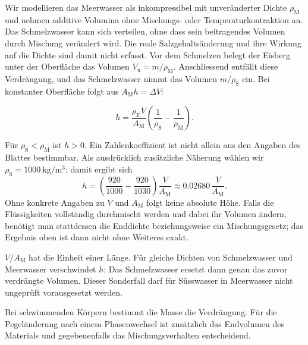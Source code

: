 Wir modellieren das Meerwasser als inkompressibel mit unveränderter Dichte
$\rho_\mathrm M$ und nehmen additive Volumina ohne Mischungs- oder
Temperaturkontraktion an. Das Schmelzwasser kann sich verteilen, ohne dass
sein beitragendes Volumen durch Mischung verändert wird. Die reale
Salzgehaltsänderung und ihre Wirkung auf die Dichte sind damit nicht erfasst.
Vor dem Schmelzen belegt der Eisberg unter der Oberfläche das Volumen
$V_\mathrm{u}=m/\rho_\mathrm M$. Anschliessend entfällt diese Verdrängung,
und das Schmelzwasser nimmt das Volumen $m/\rho_\mathrm S$ ein. Bei
konstanter Oberfläche folgt aus $A_\mathrm M h=\Delta V$:
\begin{ergebnis}[b) Meeresspiegeländerung]
\begin{equation*}
  h=\frac{\rho_\mathrm E V}{A_\mathrm M}
    \left(\frac{1}{\rho_\mathrm S}-\frac{1}{\rho_\mathrm M}\right).
\end{equation*}
\end{ergebnis}
Für $\rho_\mathrm S<\rho_\mathrm M$ ist $h>0$. Ein Zahlenkoeffizient ist
nicht allein aus den Angaben des Blattes bestimmbar. Als ausdrücklich
zusätzliche Näherung wählen wir $\rho_\mathrm S=\qty{1000}{\kilogram\per\metre\cubed}$;
damit ergibt sich
\begin{equation}
  h=\left(\frac{920}{1000}-\frac{920}{1030}\right)\frac{V}{A_\mathrm M}
    \approx \num{0.02680}\,\frac{V}{A_\mathrm M}.
\end{equation}
Ohne konkrete Angaben zu $V$ und $A_\mathrm M$ folgt keine absolute Höhe.
Falls die Flüssigkeiten vollständig durchmischt werden und dabei ihr Volumen
ändern, benötigt man stattdessen die Enddichte beziehungsweise ein
Mischungsgesetz; das Ergebnis oben ist dann nicht ohne Weiteres exakt.

\begin{kontrolle}
$V/A_\mathrm M$ hat die Einheit einer Länge. Für gleiche Dichten von
Schmelzwasser und Meerwasser verschwindet $h$: Das Schmelzwasser ersetzt dann
genau das zuvor verdrängte Volumen. Dieser Sonderfall darf für Süsswasser in
Meerwasser nicht ungeprüft vorausgesetzt werden.
\end{kontrolle}

\begin{merksatz}
Bei schwimmenden Körpern bestimmt die Masse die Verdrängung. Für die
Pegeländerung nach einem Phasenwechsel ist zusätzlich das Endvolumen des
Materials und gegebenenfalls das Mischungsverhalten entscheidend.
\end{merksatz}
